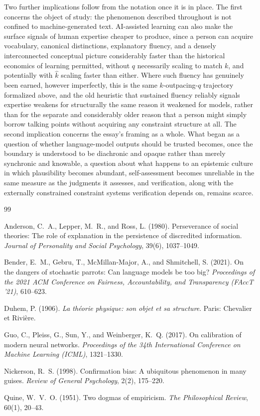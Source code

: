 \documentclass[11pt]{article}
\begin{document}
Two further implications follow from the notation once it is in place. The first concerns the object of study: the phenomenon described throughout is not confined to machine-generated text. AI-assisted learning can also make the surface signals of human expertise cheaper to produce, since a person can acquire vocabulary, canonical distinctions, explanatory fluency, and a densely interconnected conceptual picture considerably faster than the historical economics of learning permitted, without $q$ necessarily scaling to match $k$, and potentially with $\hat{k}$ scaling faster than either. Where such fluency has genuinely been earned, however imperfectly, this is the same $k$-outpacing-$q$ trajectory formalized above, and the old heuristic that sustained fluency reliably signals expertise weakens for structurally the same reason it weakened for models, rather than for the separate and considerably older reason that a person might simply borrow talking points without acquiring any constraint structure at all. The second implication concerns the essay's framing as a whole. What began as a question of whether language-model outputs should be trusted becomes, once the boundary is understood to be diachronic and opaque rather than merely synchronic and knowable, a question about what happens to an epistemic culture in which plausibility becomes abundant, self-assessment becomes unreliable in the same measure as the judgments it assesses, and verification, along with the externally constrained constraint systems verification depends on, remains scarce.

\begin{thebibliography}{99}

Anderson, C.~A., Lepper, M.~R., and Ross, L. (1980). Perseverance of social theories: The role of explanation in the persistence of discredited information. \textit{Journal of Personality and Social Psychology}, 39(6), 1037--1049.

Bender, E.~M., Gebru, T., McMillan-Major, A., and Shmitchell, S. (2021). On the dangers of stochastic parrots: Can language models be too big? \textit{Proceedings of the 2021 ACM Conference on Fairness, Accountability, and Transparency (FAccT '21)}, 610--623.

Duhem, P. (1906). \textit{La th\'eorie physique: son objet et sa structure}. Paris: Chevalier et Rivi\`ere.

Guo, C., Pleiss, G., Sun, Y., and Weinberger, K.~Q. (2017). On calibration of modern neural networks. \textit{Proceedings of the 34th International Conference on Machine Learning (ICML)}, 1321--1330.

Nickerson, R.~S. (1998). Confirmation bias: A ubiquitous phenomenon in many guises. \textit{Review of General Psychology}, 2(2), 175--220.

Quine, W.~V.~O. (1951). Two dogmas of empiricism. \textit{The Philosophical Review}, 60(1), 20--43.

\end{thebibliography}
\end{document}
